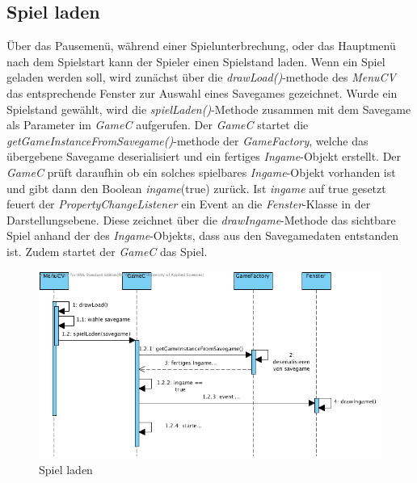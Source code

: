 \subsection{Spiel laden}
Über das Pausemenü, während einer Spielunterbrechung, oder das Hauptmenü nach dem Spielstart kann der Spieler 
einen Spielstand laden. Wenn ein Spiel geladen werden soll, wird zunächst über die \textit{drawLoad()}-methode des 
\textit{MenuCV} das entsprechende Fenster zur Auswahl eines Savegames gezeichnet. Wurde ein Spielstand gewählt,
wird die \textit{spielLaden()}-Methode zusammen mit dem Savegame als Parameter im \textit{GameC} aufgerufen. 
Der \textit{GameC} startet die \textit{getGameInstanceFromSavegame()}-methode der \textit{GameFactory}, welche das 
übergebene Savegame deserialisiert und ein fertiges \textit{Ingame}-Objekt erstellt. Der \textit{GameC} prüft 
daraufhin ob ein solches spielbares \textit{Ingame}-Objekt vorhanden ist und gibt dann den Boolean \textit{ingame}(true) 
zurück. Ist \textit{ingame} auf true gesetzt feuert der \textit{PropertyChangeListener} ein Event an die 
\textit{Fenster}-Klasse in der Darstellungsebene. Diese zeichnet über die \textit{drawIngame}-Methode das sichtbare Spiel
anhand der des \textit{Ingame}-Objekts, dass aus den Savegamedaten entstanden ist. Zudem startet der \textit{GameC} 
das Spiel.
\\

\begin{figure}[h]
	\begin{center}
		\includegraphics[trim=0cm 0cm 0cm 0cm, clip=true, width=13cm]{kapitel/laufzeitsicht/spielLaden.png}
	\end{center}
	\caption{Spiel laden}
	\label{fig:laden_uml}
\end{figure}
